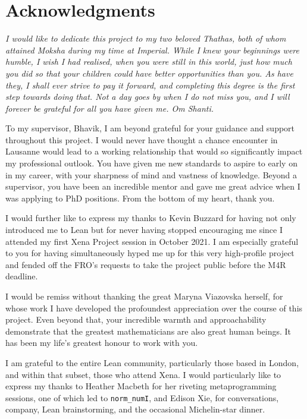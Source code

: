 \thispagestyle{empty}
\section*{Acknowledgments}

\textit{I would like to dedicate this project to my two beloved Thathas, both of whom attained Moksha during my time at Imperial. While I knew your beginnings were humble, I wish I had realised, when you were still in this world, just how much you did so that your children could have better opportunities than you. As have they, I shall ever strive to pay it forward, and completing this degree is the first step towards doing that. Not a day goes by when I do not miss you, and I will forever be grateful for all you have given me. Om Shanti.}

To my supervisor, Bhavik, I am beyond grateful for your guidance and support throughout this project. I would never have thought a chance encounter in Lausanne would lead to a working relationship that would so significantly impact my professional outlook. You have given me new standards to aspire to early on in my career, with your sharpness of mind and vastness of knowledge. Beyond a supervisor, you have been an incredible mentor and gave me great advice when I was applying to PhD positions. From the bottom of my heart, thank you.

I would further like to express my thanks to Kevin Buzzard for having not only introduced me to Lean but for never having stopped encouraging me since I attended my first Xena Project session in October 2021. I am especially grateful to you for having simultaneously hyped me up for this very high-profile project and fended off the FRO's requests to take the project public before the M4R deadline.

I would be remiss without thanking the great Maryna Viazovska herself, for whose work I have developed the profoundest appreciation over the course of this project. Even beyond that, your incredible warmth and approachability demonstrate that the greatest mathematicians are also great human beings. It has been my life's greatest honour to work with you.

I am grateful to the entire Lean community, particularly those based in London, and within that subset, those who attend Xena. I would particularly like to express my thanks to Heather Macbeth for her riveting metaprogramming sessions, one of which led to \lstinline|norm_numI|, and Edison Xie, for conversations, company, Lean brainstorming, and the occasional Michelin-star dinner.

